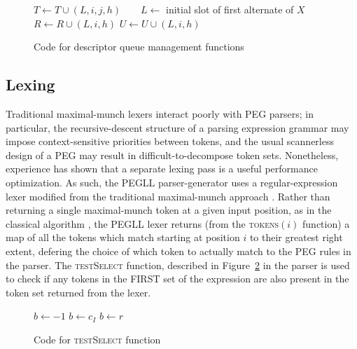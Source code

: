 \documentclass{article}
\begin{document}
\begin{figure}
\caption{Code for descriptor queue management functions} \label{add-match-fail}
\begin{algorithmic}
	\State $T \gets T \cup {(L, i, j, h)}$
		\State {}
	\Else
		\State {}
	\EndIf
\EndFunction
\State ~
		\State {}
	\Else
		\State {}
	\EndIf
\EndFunction
\State ~
	\State $L \gets$ initial slot of first alternate of $X$
	\State {}
\EndFunction
\State ~
		\State $R \gets R \cup {(L,i,h)}$
		\State $U \gets U \cup {(L,i,h)}$
	\EndIf
\EndFunction
\end{algorithmic}
\end{figure}

\subsection{Lexing}
Traditional maximal-munch lexers interact poorly with PEG parsers; in particular, the recursive-descent structure of a parsing expression grammar may impose context-sensitive priorities between tokens, and the usual scannerless design of a PEG may result in difficult-to-decompose token sets. 
Nonetheless, experience \cite{Ack19,Lau19} has shown that a separate lexing pass is a useful performance optimization.
As such, the PEGLL parser-generator uses a regular-expression lexer modified from the traditional maximal-munch approach \cite{Aetc07}. 
Rather than returning a single maximal-munch token at a given input position, as in the classical algorithm , the PEGLL lexer returns (from the \textsc{tokens}$(i)$ function) a map of all the tokens which match starting at position $i$ to their greatest right extent, defering the choice of which token to actually match to the PEG rules in the parser. 
The \textsc{testSelect} function, described in Figure~\ref{test-select} in the parser is used to check if any tokens in the FIRST set of the expression \cite{Red09} are also present in the token set returned from the lexer.

\begin{figure}
\caption[testSelect]{Code for \textsc{testSelect} function} \label{test-select}
\begin{algorithmic}
	\State $b \gets -1$
	 $b \gets c_I$ \EndIf
		 $b \gets r$ \EndIf
	\EndFor
	\State {}
\EndFunction
\end{algorithmic}
\end{figure}
\end{document}
